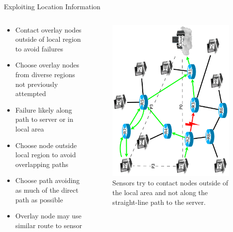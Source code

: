 \documentclass[pdftex]{beamer}
\begin{document}

\begin{frame}{Exploiting Location Information}
\begin{columns}
\begin{column}{.5\textwidth}

\begin{itemize}
	\item Contact overlay nodes outside of local region to avoid failures
	\item Choose overlay nodes from diverse regions not previously attempted
	\item Failure likely along path to server or in local area
	\item Choose node outside local	region to avoid overlapping	paths
	\item Choose path avoiding as much of the direct path as possible
	\item Overlay node may use similar route to sensor
\end{itemize}
\end{column}
	
\begin{column}{.5\textwidth}
\begin{figure}
\includegraphics[height=\textwidth,angle=-90]{exploiting_location_information}
\caption{Sensors try to contact nodes outside of the local area and not along the straight-line path to the server.}
\end{figure}
\end{column}

\end{columns}
\end{frame}
\end{document}

